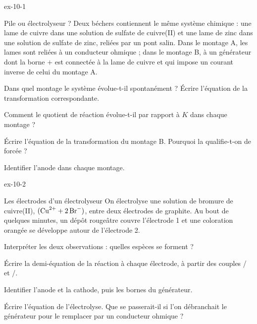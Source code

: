 \begin{blocLivre}{ex-10-1}
\begin{exercice}[1]{Pile ou électrolyseur ?}
Deux béchers contiennent le même système chimique : une lame de cuivre dans une solution de sulfate de cuivre(II) et
une lame de zinc dans une solution de sulfate de zinc, reliées par un pont salin. Dans le montage A, les lames sont
reliées à un conducteur ohmique ; dans le montage B, à un générateur dont la borne $+$ est connectée à la lame de
cuivre et qui impose un courant inverse de celui du montage A.
\begin{questions}
\item Dans quel montage le système évolue-t-il spontanément ? Écrire l'équation de la transformation correspondante.
\item Comment le quotient de réaction évolue-t-il par rapport à $K$ dans chaque montage ?
\item Écrire l'équation de la transformation du montage B. Pourquoi la qualifie-t-on de forcée ?
\item Identifier l'anode dans chaque montage.
\end{questions}
\end{exercice}
\end{blocLivre}
\begin{blocLivre}{ex-10-2}
\begin{exercice}[1]{Les électrodes d'un électrolyseur}
On électrolyse une solution de bromure de cuivre(II), $(\ce{Cu^2+}+2\,\ce{Br-})$, entre deux électrodes de graphite.
Au bout de quelques minutes, un dépôt rougeâtre couvre l'électrode 1 et une coloration orangée se développe autour de
l'électrode 2.
\begin{questions}
\item Interpréter les deux observations : quelles espèces se forment ?
\item Écrire la demi-équation de la réaction à chaque électrode, à partir des couples / et
/.
\item Identifier l'anode et la cathode, puis les bornes du générateur.
\item Écrire l'équation de l'électrolyse. Que se passerait-il si l'on débranchait le générateur pour le remplacer par
un conducteur ohmique ?
\end{questions}
\end{exercice}
\end{blocLivre}
